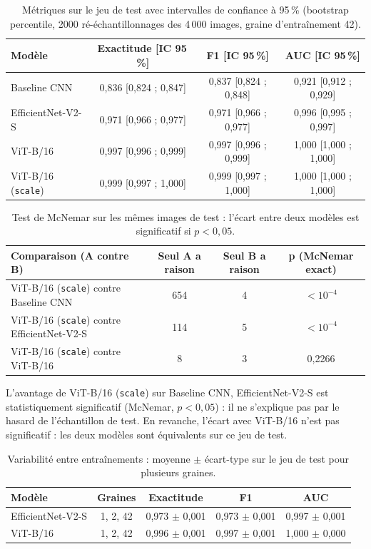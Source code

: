 \begin{table}[H]
\centering\small
\begin{tabular}{@{}lccc@{}}
\toprule
\textbf{Modèle} & \textbf{Exactitude [IC 95\,\%]} & \textbf{F1 [IC 95\,\%]} & \textbf{AUC [IC 95\,\%]} \\
\midrule
Baseline CNN & 0{,}836 [0{,}824 ; 0{,}847] & 0{,}837 [0{,}824 ; 0{,}848] & 0{,}921 [0{,}912 ; 0{,}929] \\
EfficientNet-V2-S & 0{,}971 [0{,}966 ; 0{,}977] & 0{,}971 [0{,}966 ; 0{,}977] & 0{,}996 [0{,}995 ; 0{,}997] \\
ViT-B/16 & 0{,}997 [0{,}996 ; 0{,}999] & 0{,}997 [0{,}996 ; 0{,}999] & 1{,}000 [1{,}000 ; 1{,}000] \\
ViT-B/16 (\texttt{scale}) & 0{,}999 [0{,}997 ; 1{,}000] & 0{,}999 [0{,}997 ; 1{,}000] & 1{,}000 [1{,}000 ; 1{,}000] \\
\bottomrule
\end{tabular}
\caption{Métriques sur le jeu de test avec intervalles de confiance à 95\,\% (bootstrap percentile, 2000 ré-échantillonnages des 4\,000 images, graine d'entraînement 42).}
\end{table}
\begin{table}[H]
\centering\small
\begin{tabular}{@{}lccc@{}}
\toprule
\textbf{Comparaison (A contre B)} & \textbf{Seul A a raison} & \textbf{Seul B a raison} & \textbf{p (McNemar exact)} \\
\midrule
ViT-B/16 (\texttt{scale}) contre Baseline CNN & 654 & 4 & $<10^{-4}$ \\
ViT-B/16 (\texttt{scale}) contre EfficientNet-V2-S & 114 & 5 & $<10^{-4}$ \\
ViT-B/16 (\texttt{scale}) contre ViT-B/16 & 8 & 3 & 0{,}2266 \\
\bottomrule
\end{tabular}
\caption{Test de McNemar sur les mêmes images de test : l'écart entre deux modèles est significatif si $p<0{,}05$.}
\end{table}
L'avantage de ViT-B/16 (\texttt{scale}) sur Baseline CNN, EfficientNet-V2-S est statistiquement significatif (McNemar, $p<0{,}05$) : il ne s'explique pas par le hasard de l'échantillon de test. En revanche, l'écart avec ViT-B/16 n'est pas significatif : les deux modèles sont équivalents sur ce jeu de test. 

\begin{table}[H]
\centering\small
\begin{tabular}{@{}lcccc@{}}
\toprule
\textbf{Modèle} & \textbf{Graines} & \textbf{Exactitude} & \textbf{F1} & \textbf{AUC} \\
\midrule
EfficientNet-V2-S & 1, 2, 42 & 0{,}973 $\pm$ 0{,}001 & 0{,}973 $\pm$ 0{,}001 & 0{,}997 $\pm$ 0{,}001 \\
ViT-B/16 & 1, 2, 42 & 0{,}996 $\pm$ 0{,}001 & 0{,}997 $\pm$ 0{,}001 & 1{,}000 $\pm$ 0{,}000 \\
\bottomrule
\end{tabular}
\caption{Variabilité entre entraînements : moyenne $\pm$ écart-type sur le jeu de test pour plusieurs graines.}
\end{table}
